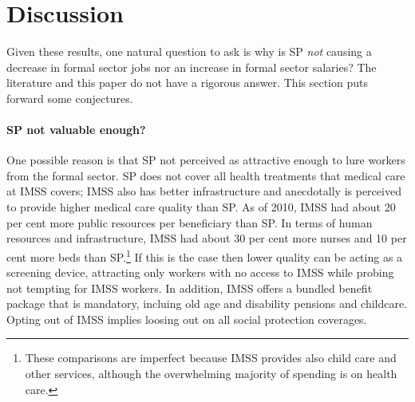 \documentclass[oneside,11pt]{article}
\begin{document}








\section{Discussion} \label{discussion}

Given these results, one natural question to ask is why is SP \textit{not} causing a decrease in formal sector jobs nor an increase in formal sector salaries? The literature and this paper do not have a rigorous answer. This section puts forward some conjectures.

\paragraph{SP not valuable enough?} One possible reason is that SP not perceived as attractive enough to lure workers from the formal sector. SP does not cover all health treatments that medical care at IMSS covers; IMSS also has better infrastructure and anecdotally is perceived to provide higher medical care quality than SP. As of 2010, IMSS had about 20 per cent more public resources per beneficiary than SP. In terms of human resources and infrastructure, IMSS had about 30 per cent more nurses and 10 per cent more beds than SP.\footnote{These comparisons are imperfect because IMSS provides also child care and other services, although the overwhelming majority of spending is on health care.} If this is the case then lower quality can be acting as a screening device, attracting only workers with no access to IMSS while probing not tempting for IMSS workers. In addition, IMSS offers a bundled benefit package that is mandatory, incluing old age and disability pensions and childcare. Opting out of IMSS implies loosing out on all social protection coverages. 
\end{document}
